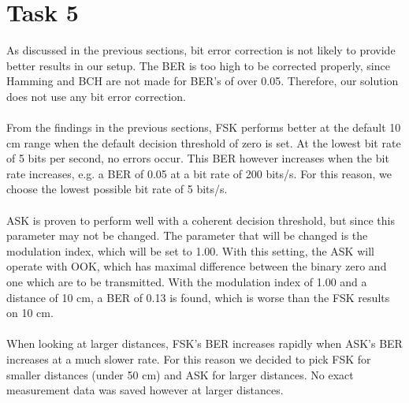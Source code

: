 \documentclass[final]{scrreprt} %
\begin{document}
\section{Task 5}
As discussed in the previous sections, bit error correction is not likely to provide better results in our setup.
The BER is too high to be corrected properly, since Hamming and BCH are not made for BER's of over 0.05.
Therefore, our solution does not use any bit error correction.
\\ \\
From the findings in the previous sections, FSK performs better at the default 10 cm range when the default decision threshold of zero is set.
At the lowest bit rate of 5 bits per second, no errors occur.
This BER however increases when the bit rate increases, e.g. a BER of 0.05 at a bit rate of 200 bits/s.
For this reason, we choose the lowest possible bit rate of 5 bits/s.
\\ \\
ASK is proven to perform well with a coherent decision threshold, but since this parameter may not be changed.
The parameter that will be changed is the modulation index, which will be set to 1.00.
With this setting, the ASK will operate with OOK, which has maximal difference between the binary zero and one which are to be transmitted.
With the modulation index of 1.00 and a distance of 10 cm, a BER of 0.13 is found, which is worse than the FSK results on 10 cm.
\\ \\
When looking at larger distances, FSK's BER increases rapidly when ASK's BER increases at a much slower rate.
For this reason we decided to pick FSK for smaller distances (under 50 cm) and ASK for larger distances.
No exact measurement data was saved however at larger distances.
\end{document}
